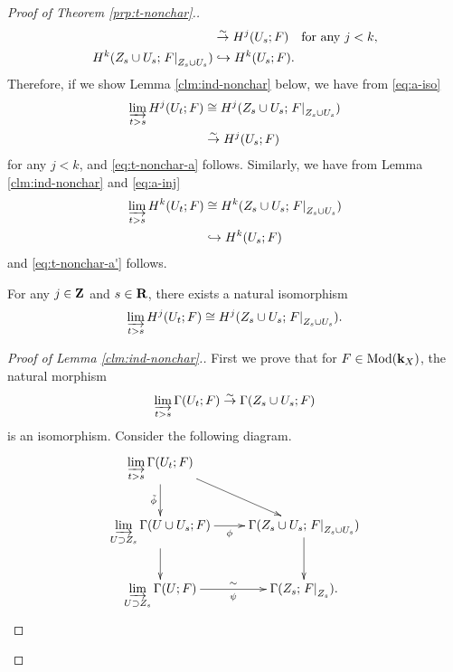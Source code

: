 \begin{proof}[{Proof of Theorem \ref{prp:t-nonchar}.}]
\begin{align}
    &\simar
    H^{j}(U_{s};F)\quad
    \text{for any \(j< k\),}\\
    \label{eq:a-inj}
    H^{k}(Z_{s}\cup U_{s};\mres[F]{Z_{s}\cup U_{s}})
    &\hookrightarrow
    H^{k}(U_{s};F).
  \end{align}
  Therefore, if we show Lemma \ref{clm:ind-nonchar} below, 
  we have from 
  \eqref{eq:a-iso}
  \begin{align*}
    \indlim[t>s]H^{j}(U_t;F)
    &\cong 
    H^{j}(Z_{s}\cup U_{s};\mres[F]{Z_{s}\cup U_{s}})\\
    &\simar
    H^{j}(U_s;F)
  \end{align*}
  for any \(j<k\), and \ref{eq:t-nonchar-a} follows. 
  Similarly, 
  we have from Lemma \ref{clm:ind-nonchar} and \eqref{eq:a-inj}
  \begin{align*}
    \indlim[t>s]H^{k}(U_t;F)
    &\cong 
    H^{k}(Z_{s}\cup U_{s};\mres[F]{Z_{s}\cup U_{s}})\\
    &\hookrightarrow
    H^{k}(U_s;F)
  \end{align*}
  and \ref{eq:t-nonchar-a'} follows. 
  \begin{Lemma+}\label{clm:ind-nonchar}
    For any \(j\in\zz\) and \(s\in\rr\), there exists a natural isomorphism 
    \[
      \indlim[t>s]H^{j}(U_t;F)
      \cong 
      H^{j}(Z_{s}\cup U_{s};\mres[F]{Z_{s}\cup U_{s}}).
    \]
  \end{Lemma+}
    \begin{proof}[Proof of Lemma \ref{clm:ind-nonchar}.]
    First we prove that 
    for \(F\in \Mod(\kk_X)\), 
    the natural morphism
    \begin{equation}\label{eq:qis-claim}
      \indlim[t>s]\Gamma(U_t;F)
      \simar 
      \Gamma(Z_{s}\cup U_{s};F)
    \end{equation}
    is an isomorphism. 
    Consider the following diagram. 
    \[\vcenter{\xymatrix{
      \indlim[t>s]\Gamma(U_t;F)
      \ar[rd]
      \ar[d]_-{\tilde{\phi}}
      &
      \\
      \indlim[U\supset Z_{s}]
      \Gamma(U\cup U_{s};F)
      \ar[d]
      \ar[r]_-{\phi}
      &
      \Gamma(Z_{s}\cup U_{s};\mres[F]{Z_{s}\cup U_{s}})
      \ar[d]
      \\
      \indlim[U\supset Z_{s}]
      \Gamma(U;F)
      \ar[r]_-{\psi}^-{\sim}
      &
      \Gamma(Z_{s};\mres[F]{Z_{s}}).}
    }
    \] 
    

\end{proof}
\end{proof}
